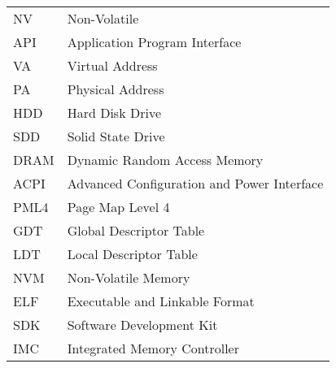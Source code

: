 \begin{tabular}{ll}
NV & Non-Volatile \tabularnewline
API & Application Program Interface \tabularnewline
VA & Virtual Address \tabularnewline
PA & Physical Address \tabularnewline
HDD & Hard Disk Drive \tabularnewline
SDD & Solid State Drive \tabularnewline
DRAM & Dynamic Random Access Memory \tabularnewline
ACPI & Advanced Configuration and Power Interface \tabularnewline
PML4 & Page Map Level 4 \tabularnewline
GDT & Global Descriptor Table \tabularnewline
LDT & Local Descriptor Table \tabularnewline
NVM & Non-Volatile Memory \tabularnewline
ELF & Executable and Linkable Format \tabularnewline
SDK & Software Development Kit \tabularnewline
IMC & Integrated Memory Controller \tabularnewline


\end{tabular}

\vspace{2em}


\pagebreak{}
